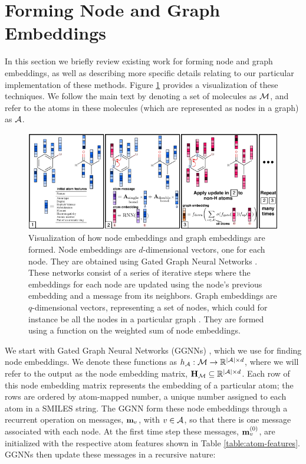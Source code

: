 \section{Forming Node and Graph Embeddings}

In this section we briefly review existing work for forming node and graph embeddings, as well as describing more specific details relating to our particular implementation of these methods. Figure \ref{fig:graph_nn} provides a visualization of these techniques. 
We follow the main text by denoting a set of molecules as ${\mathcal{M}}$, and refer to the atoms in these molecules (which are represented as nodes in a graph) as ${\mathcal{A}}$.


\begin{figure}
\centering
\includegraphics[width=\textwidth]{imgs/graph_nn}
\caption{
Visualization of how node embeddings and graph embeddings are formed. 
Node embeddings are $d$-dimensional vectors, one for each node. 
They are obtained using Gated Graph Neural Networks \citep{li2016gated}.
These networks consist of a series of iterative steps where the embeddings for each node are updated using the node's previous embedding and a message from its neighbors.
 Graph embeddings are $q$-dimensional vectors, representing a set of nodes, which could for instance be all the nodes in a particular graph \citep{li2018learning}.
  They are formed using a function on the weighted sum of node embeddings.
}
\label{fig:graph_nn}
\end{figure}


 We start with Gated Graph Neural Networks (GGNNs) \citep{li2016gated, gilmer2017neural}, which we use for finding node embeddings.
 We denote these functions as $h_{{\mathcal{A}}}: {\mathcal{M}} \to \mathbb{R}^{|{\mathcal{A}}|\times d}$, where we will refer to the output as the node embedding matrix, ${\mathbf{H}}_{{\mathcal{M}}} \subseteq \mathbb{R}^{|{\mathcal{A}}|\times d}$. 
Each row of this node embedding matrix represents the embedding of a particular atom; the rows are ordered by atom-mapped number, a unique number assigned to each atom in a SMILES string.
The GGNN form these node embeddings through a recurrent operation on messages, ${\mathbf{m}}_v$, with $v \in {\mathcal{A}}$, so that there is one message associated with each node.
At the first time step these messages, ${\mathbf{m}}_v^{(0)}$, are initialized with the respective atom features shown in Table \ref{table:atom-features}. GGNNs then update these messages in a recursive nature:

